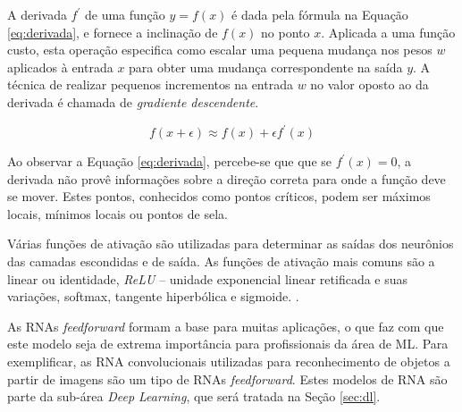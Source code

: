 A derivada $f^\prime$ de uma função $y = f(x)$ é dada pela fórmula na Equação \ref{eq:derivada}, e fornece a inclinação de $f(x)$ no ponto $x$. Aplicada a uma função custo, esta operação especifica como escalar uma pequena mudança nos pesos $w$ aplicados à entrada $x$ para obter uma mudança correspondente na saída $y$. A técnica de realizar pequenos incrementos na entrada $w$ no valor oposto ao da derivada é chamada de \emph{gradiente descendente}.

\begin{equation}\label{eq:derivada}
	f(x+\epsilon) \approx f(x) + \epsilon f^\prime(x)
\end{equation}

Ao observar a Equação \ref{eq:derivada}, percebe-se que que se $f^\prime(x) =0 $, a derivada não provê informações sobre a direção correta para onde a função deve se mover. Estes pontos, conhecidos como pontos críticos, podem ser máximos locais, mínimos locais ou pontos de sela.

\cite{goodfellow2016deep}




Várias funções de ativação são utilizadas para determinar as saídas dos neurônios das camadas escondidas e de saída. As funções de ativação mais comuns são a linear ou identidade, \emph{ReLU} -- unidade exponencial linear retificada e suas variações, softmax, tangente hiperbólica e sigmoide.
.


As RNAs \emph{feedforward} formam a base para muitas aplicações, o que faz com que este modelo seja de extrema importância para profissionais da área de ML. Para exemplificar, as RNA convolucionais utilizadas para reconhecimento de objetos a partir de imagens são um tipo de RNAs \emph{feedforward}. Estes modelos de RNA são parte da sub-área \emph{Deep Learning}, que será tratada na Seção \ref{sec:dl}.
